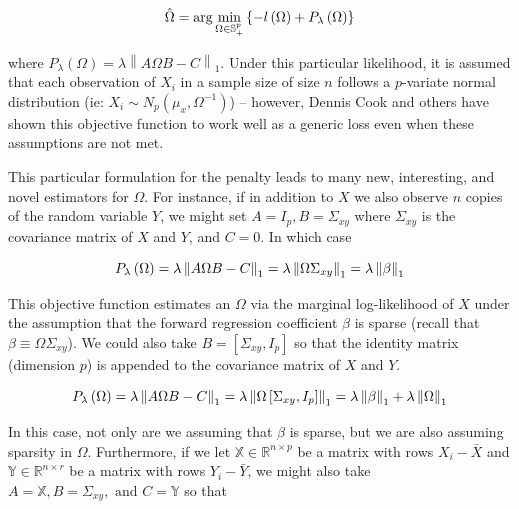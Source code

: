 \documentclass[11pt,]{report}
\begin{document}
\begin{equation}
\hat{\Omega} = \arg\min_{\Omega \in \mathbb{S}_{+}^{p}}\left\{ -l\left( \Omega \right) + P_{\lambda}\left( \Omega \right) \right\}
\label{eq:penloglik4}\notag
\end{equation}

where \(P_{\lambda}\left(\Omega \right) = \lambda\left\| A\Omega B - C \right\|_{1}\). Under this particular likelihood, it is assumed that each observation of \(X_{i}\) in a sample size of size \(n\) follows a \(p\)-variate normal distribution (ie: \(X_{i} \sim N_{p}\left( \mu_{x}, \Omega^{-1} \right)\)) -- however, Dennis Cook and others have shown this objective function to work well as a generic loss even when these assumptions are not met.

This particular formulation for the penalty leads to many new, interesting, and novel estimators for \(\Omega\). For instance, if in addition to \(X\) we also observe \(n\) copies of the random variable \(Y\), we might set \(A = I_{p}, B = \Sigma_{xy}\) where \(\Sigma_{xy}\) is the covariance matrix of \(X\) and \(Y\), and \(C = 0\). In which case

\begin{equation}
P_{\lambda}\left(\Omega \right) = \lambda\left\| A\Omega B - C \right\|_{1} = \lambda\left\| \Omega\Sigma_{xy} \right\|_{1} = \lambda\left\| \beta \right\|_{1}
\label{eq:pen3}\notag
\end{equation}

This objective function estimates an \(\Omega\) via the marginal log-likelihood of \(X\) under the assumption that the forward regression coefficient \(\beta\) is sparse (recall that \(\beta \equiv \Omega\Sigma_{xy}\)). We could also take \(B = \left[ \Sigma_{xy}, I_{p} \right]\) so that the identity matrix (dimension \(p\)) is appended to the covariance matrix of \(X\) and \(Y\).

\begin{equation}
P_{\lambda}\left(\Omega \right) = \lambda\left\| A\Omega B - C \right\|_{1} = \lambda\left\| \Omega\left[\Sigma_{xy}, I_{p}\right] \right\|_{1} = \lambda\left\| \beta \right\|_{1} + \lambda\left\| \Omega \right\|_{1}
\label{eq:pen4}\notag
\end{equation}

In this case, not only are we assuming that \(\beta\) is sparse, but we are also assuming sparsity in \(\Omega\). Furthermore, if we let \(\mathbb{X} \in \mathbb{R}^{n \times p}\) be a matrix with rows \(X_{i} - \bar{X}\) and \(\mathbb{Y} \in \mathbb{R}^{n \times r}\) be a matrix with rows \(Y_{i} - \bar{Y}\), we might also take \(A = \mathbb{X}, B = \Sigma_{xy}, \mbox{ and } C = \mathbb{Y}\) so that
\end{document}
